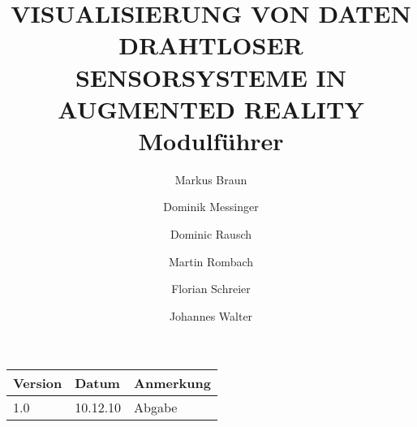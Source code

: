 \documentclass[a4paper]{scrartcl}
\title{VISUALISIERUNG VON DATEN DRAHTLOSER SENSORSYSTEME IN AUGMENTED REALITY \\ Modulführer}
\author{Markus Braun \and Dominik Messinger \and Dominic Rausch \and Martin Rombach \and Florian Schreier \and Johannes Walter }
\begin{document}
\maketitle

\begin{center}
\begin{tabular}{|l|l|l|}
\hline
Version & Datum & Anmerkung \\
\hline
\hline
 1.0 & 10.12.10 & Abgabe\\
\hline
\end{tabular}
\end{center}

\newpage
\tableofcontents
\newpage


\newpage


\newpage


\newpage


\newpage


\newpage


\newpage
\end{document}
